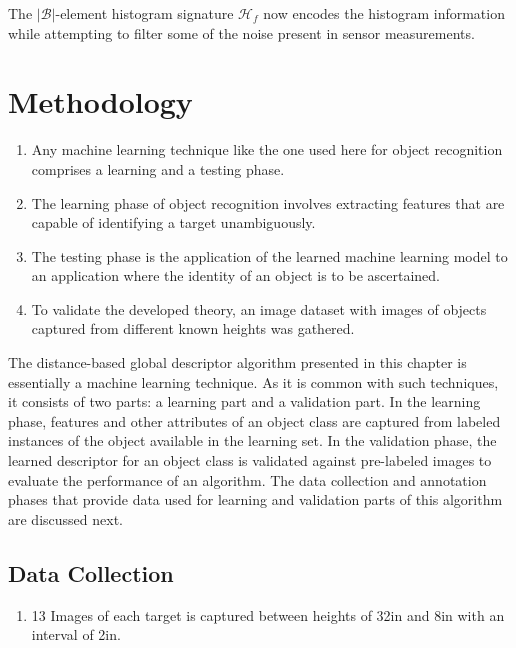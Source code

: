 \documentclass {udthesis}
\begin{document}
The $|\mathcal{B}|$-element histogram signature $\mathcal{H}_f$ now encodes the histogram information while attempting to filter some of the noise present in sensor measurements.

\section{Methodology}
\label{sec:distdes_methodology}

\begin{enumerate}
	\item Any machine learning technique like the one used here for object recognition comprises a learning and a testing phase.
	
	\item The learning phase of object recognition involves extracting features that are capable of identifying a target unambiguously.
	
	\item The testing phase is the application of the learned machine learning model to an application where the identity of an object is to be ascertained.
	
	\item To validate the developed theory, an image dataset with images of objects captured from different known heights was gathered.
\end{enumerate}	


The distance-based global descriptor algorithm presented in this chapter is essentially a machine learning technique. As it is common with such techniques, it consists of two parts: a learning part and a validation part. In the learning phase, features and other attributes of an object class are captured from labeled instances of the object available in the learning set. In the validation phase, the learned descriptor for an object class is validated against pre-labeled images to evaluate the performance of an algorithm. The data collection and annotation phases that provide data used for learning and validation parts of this algorithm are discussed next.

\subsection{Data Collection}
\label{sec:distdes_data_collection}

\begin{enumerate}
  \item 13 Images of each target is captured between heights of 32in and 8in with an interval of 2in.
\end{enumerate}	
\end{document}
